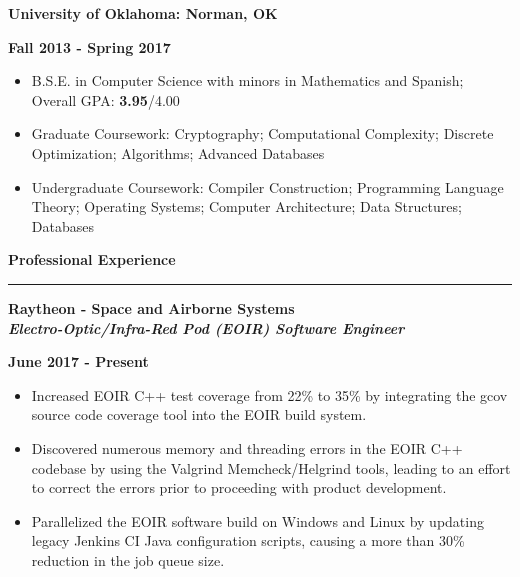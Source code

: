 \documentclass[10pt,letterpaper]{article}
\begin{document}
\begin{minipage}[t]{0.5\textwidth}
	\begin{flushleft}
		\textbf{University of Oklahoma: Norman, OK}\\
		
	\end{flushleft}
\end{minipage}
\begin{minipage}[t]{0.47\textwidth}
	\begin{flushright}
		\textbf{Fall 2013 - Spring 2017}
		
	\end{flushright}
\end{minipage}
\begin{itemize}[topsep=0pt]
	\setlength\itemsep{-0.10em}
	\item B.S.E. in Computer Science with minors in Mathematics and Spanish; Overall GPA: \textbf{3.95}/{4.00}
	\item Graduate Coursework: Cryptography; Computational Complexity; Discrete Optimization;
	      Algorithms; Advanced Databases
	\item Undergraduate Coursework: Compiler Construction; Programming Language Theory;
	      Operating Systems; Computer Architecture; Data Structures; Databases
\end{itemize}

\medskip

\begin{large}
	\textbf{Professional Experience}
\end{large}

\smallskip \hrule \smallskip

\begin{minipage}[t]{0.53\textwidth}
	\begin{flushleft}
		\textbf{Raytheon - Space and Airborne Systems}\\
		\textbf{\textit{Electro-Optic/Infra-Red Pod (EOIR) Software Engineer}}\\
	\end{flushleft}
\end{minipage}
\begin{minipage}[t]{0.44\textwidth}
	\begin{flushright}
		\textbf{June 2017 - Present}
	\end{flushright}
\end{minipage}

\begin{itemize}[noitemsep,topsep=0pt]
	\setlength\itemsep{-0.10em}
	\item Increased EOIR C++ test coverage from 22\% to 35\% by integrating the gcov
	      source code coverage tool into the EOIR build system.
	\item Discovered numerous memory and threading errors in the EOIR C++ codebase
	      by using the Valgrind Memcheck/Helgrind tools, leading to an effort to correct
	      the errors prior to proceeding with product development.
	\item Parallelized the EOIR software build on Windows and Linux by updating legacy Jenkins
	      CI Java configuration scripts, causing a more than 30\% reduction in the job
	      queue size.
\end{itemize}
\end{document}
